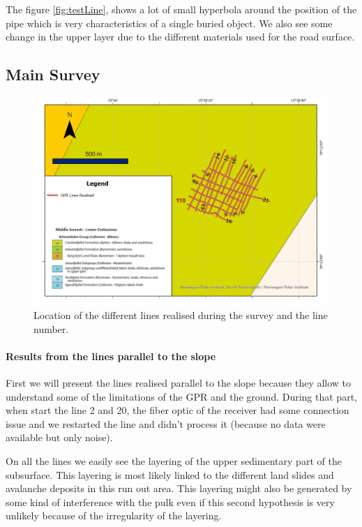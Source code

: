The figure \ref{fig:testLine}, shows a lot of small hyperbola around the position of the pipe which is very characteristics of a single buried object. We also see some change in the upper layer due to the different materials used for the road surface.


\subsection{Main Survey}

\begin{figure}[H]
    \centering
    \includegraphics[width=\linewidth]{Images/00_Results/GPR LIne.jpg}
    \caption{Location of the different lines realised during the survey and the line number.}
    \label{fig:LocGPRLines}
\end{figure}

\paragraph{Results from the lines parallel to the slope} First we will present the lines realised parallel to the slope because they allow to understand some of the limitations of the GPR and the ground. During that part, when start the line 2 and 20, the fiber optic of the receiver had some connection issue and we restarted the line and didn't process it (because no data were available but only noise).

On all the lines we easily see the layering of the upper sedimentary part of the subsurface. This layering is most likely linked to the different land slides and avalanche deposits in this run out area. This layering might also be generated by some kind of interference with the pulk even if this second hypothesis is very unlikely because of the irregularity of the layering.

